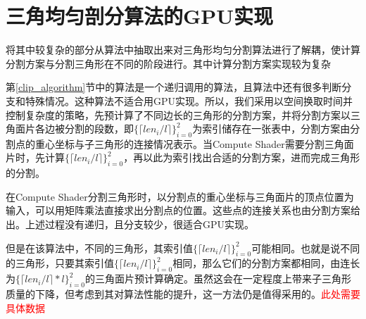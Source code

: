 \section{三角均匀剖分算法的GPU实现}
将其中较复杂的部分从算法中抽取出来对三角形均匀分割算法进行了解耦，使计算分割方案与分割三角形在不同的阶段进行。其中计算分割方案实现较为复杂

第\autoref{clip_algorithm}节中的算法是一个递归调用的算法，且算法中还有很多判断分支和特殊情况。这种算法不适合用GPU实现。所以，我们采用以空间换取时间并控制复杂度的策略，先预计算了不同边长的三角形的分割方案，并将分割方案以三角面片各边被分割的段数，即$\{\lceil len_i/l \rceil\}^{2}_{i=0}$为索引储存在一张表中，分割方案由分割点的重心坐标与子三角形的连接情况表示。当Compute Shader需要分割三角面片时，先计算$\{\lceil len_i/l \rceil\}^{2}_{i=0}$，再以此为索引找出合适的分割方案，进而完成三角形的分割。

在Compute Shader分割三角形时，以分割点的重心坐标与三角面片的顶点位置为输入，可以用矩阵乘法直接求出分割点的位置。这些点的连接关系也由分割方案给出。上述过程没有递归，且分支较少，很适合GPU实现。

但是在该算法中，不同的三角形，其索引值$\{\lceil len_i/l \rceil\}^{2}_{i=0}$可能相同。也就是说不同的三角形，只要其索引值$\{\lceil len_i/l \rceil\}^{2}_{i=0}$相同，那么它们的分割方案都相同，由连长为$\{\lceil len_i/l \rceil * l\}^{2}_{i=0}$的三角面片预计算确定。虽然这会在一定程度上带来子三角形质量的下降，但考虑到其对算法性能的提升，这一方法仍是值得采用的。\textcolor{red}{此处需要具体数据}



